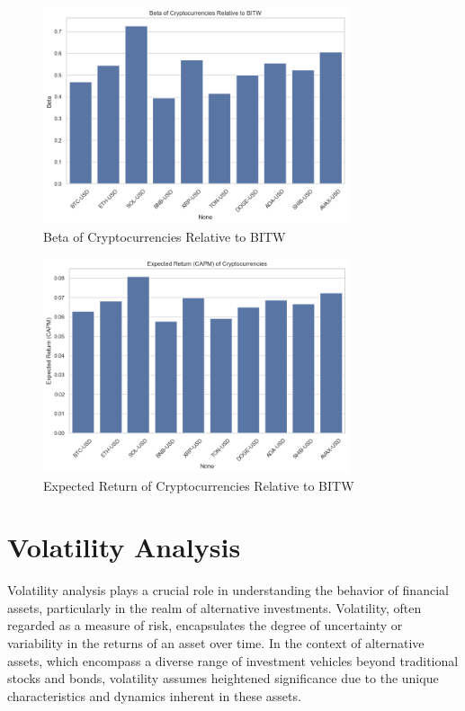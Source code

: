 \documentclass{ledger}
\begin{document}
\begin{figure}
    \centering
    \includegraphics[width=0.8\textwidth]{./code/risk-and-return-analysis/capm/beta.png}
    \caption{Beta of Cryptocurrencies Relative to BITW}
    \label{fig:beta}
\end{figure}

\begin{figure}
    \centering
    \includegraphics[width=0.8\textwidth]{./code/risk-and-return-analysis/capm/exp_return.png}
    \caption{Expected Return of Cryptocurrencies Relative to BITW}
    \label{fig:exp_return}
\end{figure}

\section{Volatility Analysis}

Volatility analysis plays a crucial role in understanding the behavior of financial assets, particularly in the realm of alternative investments. Volatility, often regarded as a measure of risk, encapsulates the degree of uncertainty or variability in the returns of an asset over time. In the context of alternative assets, which encompass a diverse range of investment vehicles beyond traditional stocks and bonds, volatility assumes heightened significance due to the unique characteristics and dynamics inherent in these assets.
\end{document}
